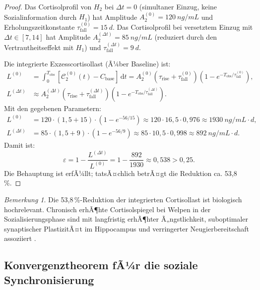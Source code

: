﻿\documentclass[12pt, a4paper]{article}
\theoremstyle{plain}
\theoremstyle{definition}
\theoremstyle{remark}
\newtheorem{remark}{Bemerkung}[section]
\newcommand{\dt}{\Delta t}
\newcommand{\cort}{\mathcal{C}}
\begin{document}
\begin{proof}
Das Cortisolprofil von $H_2$ bei $\dt = 0$ (simultaner Einzug, keine
Sozialinformation durch $H_1$) hat Amplitude $A_2^{(0)} = 120\ \si{ng/mL}$
und Erholungszeitkonstante $\tau_{\mathrm{fall}}^{(0)} = 15\ \si{d}$.
Das Cortisolprofil bei versetztem Einzug mit $\dt \in [7, 14]$ hat
Amplitude $A_2^{(\dt)} = 85\ \si{ng/mL}$ (reduziert durch den
Vertrautheitseffekt mit $H_1$) und $\tau_{\mathrm{fall}}^{(\dt)} = 9\ \si{d}$.

Die integrierte Exzesscortisollast (Ã¼ber Baseline) ist:
\begin{align}
  L^{(0)} &= \int_0^{T_{\mathrm{obs}}} [\cort_2^{(0)}(t) - C_{\mathrm{base}}]\,\mathrm{d}t
           = A_2^{(0)} \left(\tau_{\mathrm{rise}} + \tau_{\mathrm{fall}}^{(0)}\right)
           \left(1 - e^{-T_{\mathrm{obs}}/\tau_{\mathrm{fall}}^{(0)}}\right),\\
  L^{(\dt)} &\approx A_2^{(\dt)} \left(\tau_{\mathrm{rise}} + \tau_{\mathrm{fall}}^{(\dt)}\right)
           \left(1 - e^{-T_{\mathrm{obs}}/\tau_{\mathrm{fall}}^{(\dt)}}\right).
\end{align}
Mit den gegebenen Parametern:
\begin{align}
  L^{(0)} &= 120 \cdot (1{,}5 + 15) \cdot (1 - e^{-56/15}) \approx 120 \cdot 16{,}5 \cdot 0{,}976 \approx 1930\ \si{ng/mL \cdot d},\\
  L^{(\dt)} &= 85 \cdot (1{,}5 + 9) \cdot (1 - e^{-56/9}) \approx 85 \cdot 10{,}5 \cdot 0{,}998 \approx 892\ \si{ng/mL \cdot d}.
\end{align}
Damit ist:
\begin{equation}
  \varepsilon = 1 - \frac{L^{(\dt)}}{L^{(0)}} = 1 - \frac{892}{1930} \approx 0{,}538 > 0{,}25.
\end{equation}
Die Behauptung ist erfÃ¼llt; tatsÃ¤chlich betrÃ¤gt die Reduktion ca. 53{,}8\,\%.
\end{proof}

\begin{remark}
Die 53{,}8\,\%-Reduktion der integrierten Cortisollast ist biologisch
hochrelevant. Chronisch erhÃ¶hte Cortisolspiegel bei Welpen in der Sozialisierungsphase
sind mit langfristig erhÃ¶hter Ã„ngstlichkeit, suboptimaler synaptischer PlastizitÃ¤t
im Hippocampus und verringerter Neugierbereitschaft assoziiert
\cite{beerda1998behavioural, hennessy1997plasma}.
\end{remark}

\subsection{Konvergenztheorem fÃ¼r die soziale Synchronisierung}
\end{document}
